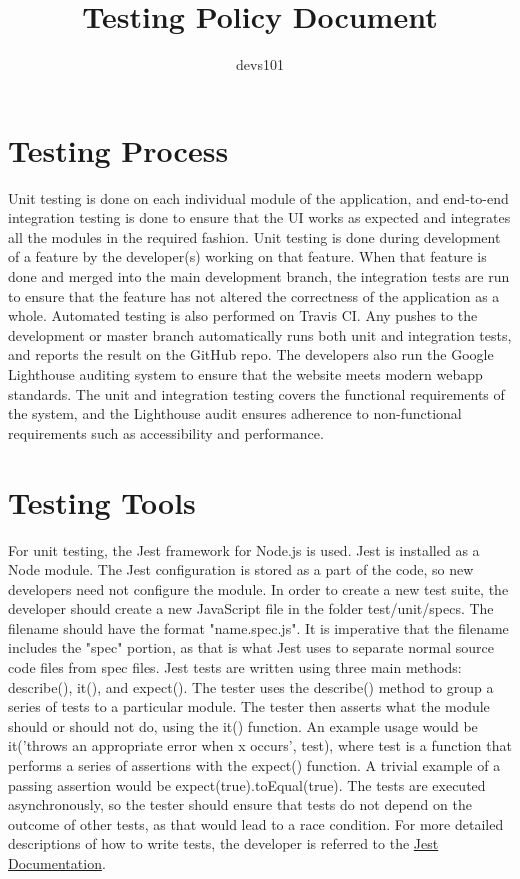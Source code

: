 \documentclass{article}
\title{Testing Policy Document}
\author{devs101}
\begin{document}
\maketitle
\newpage
\section{Testing Process}
Unit testing is done on each individual module of the application, and end-to-end integration
testing is done to ensure that the UI works as expected and integrates all the modules in the 
required fashion. Unit testing is done during development of a feature by the developer(s) working
on that feature. When that feature is done and merged into the main development branch, the
integration tests are run to ensure that the feature has not altered the correctness of the
application as a whole. Automated testing is also performed on Travis CI. Any pushes to
the development or master branch automatically runs both unit and integration tests, and
reports the result on the GitHub repo. The developers also run the Google Lighthouse
auditing system to ensure that the website meets modern webapp standards. The unit and
integration testing covers the functional requirements of the system, and the Lighthouse audit
ensures adherence to non-functional requirements such as accessibility and performance.

\section{Testing Tools}
For unit testing, the Jest framework for Node.js is used. Jest is installed as a Node
module. The Jest configuration is stored as a part of the code, so new developers need not
configure the module. In order to create a new test suite, the developer should create a
new JavaScript file in the folder test/unit/specs. The filename should have the format
"name.spec.js". It is imperative that the filename includes the "spec" portion, as that is
what Jest uses to separate normal source code files from spec files.
Jest tests are written using three main methods: describe(), it(), and expect().
The tester uses the describe() method to group a series of tests to a particular module.
The tester then asserts what the module should or should not do, using the it() function.
An example usage would be it('throws an appropriate error when x occurs', test), where
test is a function that performs a series of assertions with the expect() function.
A trivial example of a passing assertion would be expect(true).toEqual(true). The tests
are executed asynchronously, so the tester should ensure that tests do not depend on the
outcome of other tests, as that would lead to a race condition. For more detailed
descriptions of how to write tests, the developer is referred to the 
\href{https://jestjs.io/docs/en/using-matchers}{Jest Documentation}.
\end{document}
